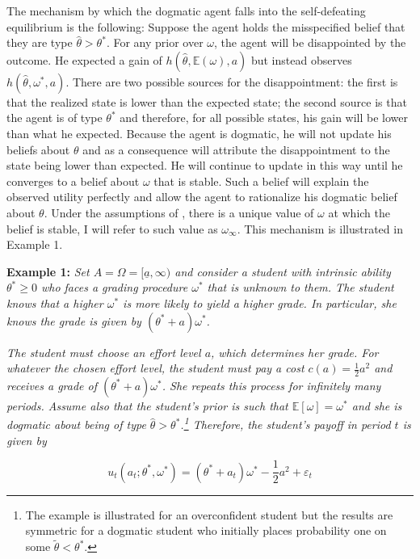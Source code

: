 \documentclass[
  12pt,
]{article}
\begin{document}
The mechanism by which the dogmatic agent falls into the self-defeating
equilibrium is the following: Suppose the agent holds the misspecified
belief that they are type \(\hat{\theta}>\theta^*\). For any prior over
\(\omega\), the agent will be disappointed by the outcome. He expected a
gain of \(h(\hat{\theta}, \mathbb{E}(\omega), a)\) but instead observes
\(h(\hat{\theta}, \omega^*, a)\). There are two possible sources for the
disappointment: the first is that the realized state is lower than the
expected state; the second source is that the agent is of type
\(\theta^*\) and therefore, for all possible states, his gain will be
lower than what he expected. Because the agent is dogmatic, he will not
update his beliefs about \(\theta\) and as a consequence will attribute
the disappointment to the state being lower than expected. He will
continue to update in this way until he converges to a belief about
\(\omega\) that is stable. Such a belief will explain the observed
utility perfectly and allow the agent to rationalize his dogmatic belief
about \(\theta\). Under the assumptions of \citet{Heidhues2018}, there
is a unique value of \(\omega\) at which the belief is stable, I will
refer to such value as \(\omega_\infty\). This mechanism is illustrated
in Example 1.

\textbf{Example 1: } \emph{Set \(A = \Omega=[\underline{a}, \infty)\)
and consider a student with intrinsic ability \(\theta^*\geq 0\) who
faces a grading procedure \(\omega^*\) that is unknown to them. The
student knows that a higher \(\omega^*\) is more likely to yield a
higher grade. In particular, she knows the grade is given by
\((\theta^*+a)\omega^*\).}

\emph{The student must choose an effort level \(a\), which determines
her grade. For whatever the chosen effort level, the student must pay a
cost \(c(a) = \frac{1}{2}a^2\) and receives a grade of
\((\theta^*+a)\omega^*\). She repeats this process for infinitely many
periods. Assume also that the student's prior is such that
\(\mathbb{E}[\omega]= \omega^*\) and she is dogmatic about being of type
\(\hat{\theta}>\theta^*\).\footnote{The example is illustrated for an overconfident student but 
the results are symmetric for a dogmatic student who initially 
places probability one on some $\tilde{\theta}<\theta^*$.} Therefore,
the student's payoff in period \(t\) is given by }

\begin{equation}
u_t(a_t; \theta^*, \omega^*) = (\theta^*+a_t)\omega^* - \frac{1}{2}a^2 + \varepsilon_t
\end{equation}
\end{document}
